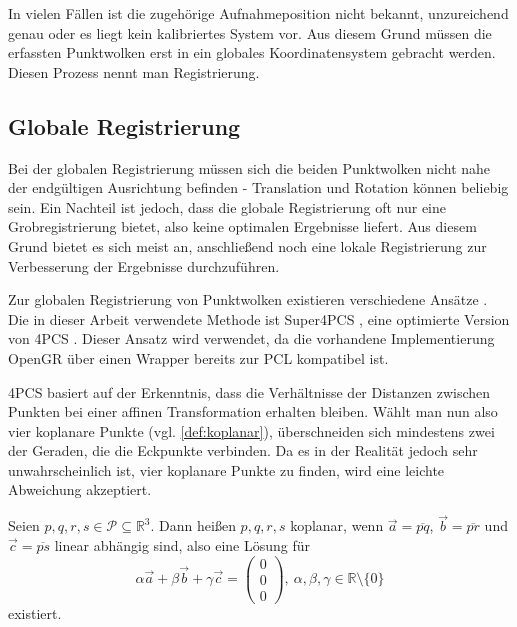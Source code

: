 In vielen Fällen ist die zugehörige Aufnahmeposition nicht bekannt, unzureichend genau oder es liegt kein kalibriertes System vor.
Aus diesem Grund müssen die erfassten Punktwolken erst in ein globales Koordinatensystem gebracht werden.
Diesen Prozess nennt man Registrierung.


\subsection{Globale Registrierung}
\label{subsec:global-registration}

Bei der globalen Registrierung müssen sich die beiden Punktwolken nicht nahe der endgültigen Ausrichtung befinden - Translation und Rotation können beliebig sein.
Ein Nachteil ist jedoch, dass die globale Registrierung oft nur eine Grobregistrierung bietet, also keine optimalen Ergebnisse liefert.
Aus diesem Grund bietet es sich meist an, anschließend noch eine lokale Registrierung zur Verbesserung der Ergebnisse durchzuführen.

Zur globalen Registrierung von Punktwolken existieren verschiedene Ansätze \cite{chaudhury2015global, zhou2016fast, rusu2009fast}.
Die in dieser Arbeit verwendete Methode ist Super4PCS \cite{mellado2014super4pcs}, eine optimierte Version von \ac{4PCS} \cite{aiger2008fpcs}.
Dieser Ansatz wird verwendet, da die vorhandene Implementierung \ac{OpenGR} \cite{mellado2018opengr} über einen Wrapper bereits zur \ac{PCL} kompatibel ist.


\ac{4PCS} basiert auf der Erkenntnis, dass die Verhältnisse der Distanzen zwischen Punkten bei einer affinen Transformation erhalten bleiben.
Wählt man nun also vier koplanare Punkte (vgl. \autoref{def:koplanar}), überschneiden sich mindestens zwei der Geraden, die die Eckpunkte verbinden.
Da es in der Realität jedoch sehr unwahrscheinlich ist, vier koplanare Punkte zu finden, wird eine leichte Abweichung akzeptiert.

\begin{definition}
\label{def:koplanar}
Seien $p, q, r, s \in \mathcal{P} \subseteq \mathbb{R}^3$. Dann heißen $p,q,r,s$ koplanar, wenn $\overrightarrow{a} = \overline{pq}$, $\overrightarrow{b} = \overline{pr}$ und $\overrightarrow{c} = \overline{ps}$ linear abhängig sind, also eine Lösung für
$$
\alpha \overrightarrow{a} + \beta \overrightarrow{b} + \gamma \overrightarrow{c} = \begin{pmatrix}0\\0\\0\end{pmatrix},\ \alpha,\beta,\gamma \in \mathbb{R} \setminus \{0\}
$$
existiert.
\end{definition}

